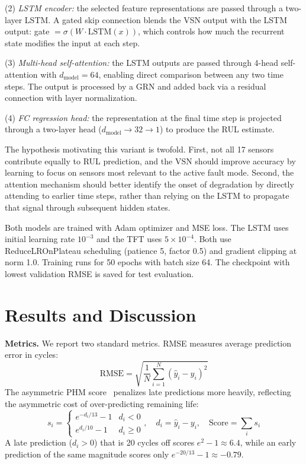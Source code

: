 \documentclass{article}
\begin{document}
(2) \textit{LSTM encoder:} the selected feature representations are passed through a two-layer LSTM. A gated skip connection blends the VSN output with the LSTM output: gate $= \sigma(W \cdot \text{LSTM}(x))$, which controls how much the recurrent state modifies the input at each step.

(3) \textit{Multi-head self-attention:} the LSTM outputs are passed through 4-head self-attention with $d_\text{model}=64$, enabling direct comparison between any two time steps. The output is processed by a GRN and added back via a residual connection with layer normalization.

(4) \textit{FC regression head:} the representation at the final time step is projected through a two-layer head ($d_\text{model} \to 32 \to 1$) to produce the RUL estimate.

The hypothesis motivating this variant is twofold. First, not all 17 sensors contribute equally to RUL prediction, and the VSN should improve accuracy by learning to focus on sensors most relevant to the active fault mode. Second, the attention mechanism should better identify the onset of degradation by directly attending to earlier time steps, rather than relying on the LSTM to propagate that signal through subsequent hidden states.

Both models are trained with Adam optimizer and MSE loss. The LSTM uses initial learning rate $10^{-3}$ and the TFT uses $5 \times 10^{-4}$. Both use ReduceLROnPlateau scheduling (patience 5, factor 0.5) and gradient clipping at norm 1.0. Training runs for 50 epochs with batch size 64. The checkpoint with lowest validation RMSE is saved for test evaluation.

\section{Results and Discussion}

\textbf{Metrics.}
We report two standard metrics. RMSE measures average prediction error in cycles:
\begin{equation}
\text{RMSE} = \sqrt{\frac{1}{N}\sum_{i=1}^{N}(\hat{y}_i - y_i)^2}
\end{equation}
The asymmetric PHM score~\cite{saxena2008} penalizes late predictions more heavily, reflecting the asymmetric cost of over-predicting remaining life:
\begin{equation}
s_i = \begin{cases} e^{-d_i/13} - 1 & d_i < 0 \\ e^{d_i/10} - 1 & d_i \geq 0 \end{cases}, \quad d_i = \hat{y}_i - y_i, \quad \text{Score} = \sum_i s_i
\end{equation}
A late prediction ($d_i > 0$) that is 20 cycles off scores $e^2 - 1 \approx 6.4$, while an early prediction of the same magnitude scores only $e^{-20/13} - 1 \approx -0.79$.
\end{document}
